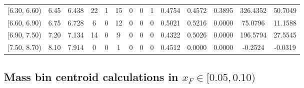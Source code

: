 \begin{table}[htbp]
{\begin{tabular}{cc|c|cccccc|ccc|cc}
        {[6.30, 6.60)} & 6.45 & 6.438 & 22 & 1 & 15 & 0 & 0 & 1 & 0.4754 & 0.4572 & 0.3895 & 326.4352 & 50.7049 \\
        {[6.60, 6.90)} & 6.75 & 6.728 & 6 & 0 & 12 & 0 & 0 & 0 & 0.5021 & 0.5216 & 0.0000 & 75.0796 & 11.1588 \\
        {[6.90, 7.50)} & 7.20 & 7.134 & 14 & 0 & 9 & 0 & 0 & 0 & 0.4322 & 0.5026 & 0.0000 & 196.5794 & 27.5545 \\
        {[7.50, 8.70)} & 8.10 & 7.914 & 0 & 0 & 1 & 0 & 0 & 0 & 0.4512 & 0.0000 & 0.0000 & -0.2524 & -0.0319 \\
        \hline\hline
    \end{tabular}
    }
\end{table}

\clearpage
\subsection{\texorpdfstring{Mass bin centroid calculations in $x_F \in [0.05, 0.10)$}{Mass bin centroid calculations in x\_F in [0.05, 0.10)]}}


